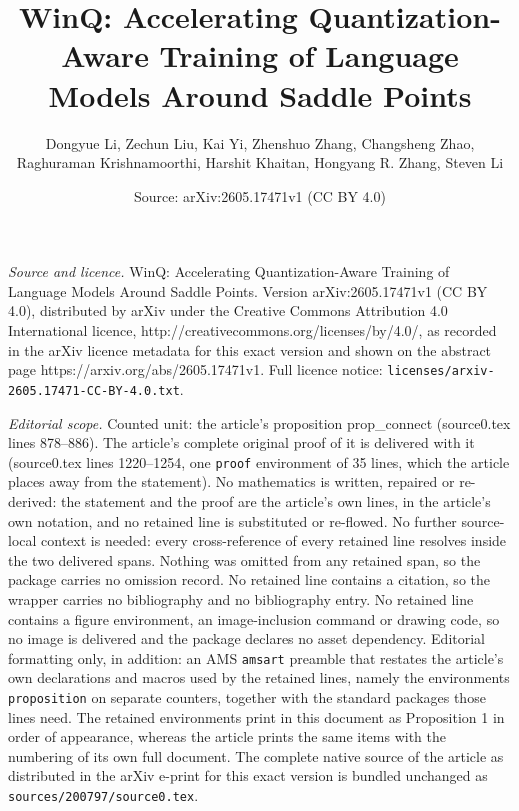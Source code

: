 \documentclass[10pt,a4paper]{amsart}
\title{WinQ: Accelerating Quantization-Aware Training of Language Models Around Saddle Points}
\author{Dongyue Li, Zechun Liu, Kai Yi, Zhenshuo Zhang, Changsheng Zhao, Raghuraman Krishnamoorthi, Harshit Khaitan, Hongyang R. Zhang, Steven Li}
\date{Source: arXiv:2605.17471v1 (CC BY 4.0)}
\begin{document}
\maketitle

\noindent\emph{Source and licence.} WinQ: Accelerating Quantization-Aware Training of Language Models Around Saddle Points. Version arXiv:2605.17471v1 (CC BY 4.0), distributed by arXiv under the Creative Commons Attribution 4.0 International licence, http://creativecommons.org/licenses/by/4.0/, as recorded in the arXiv licence metadata for this exact version and shown on the abstract page https://arxiv.org/abs/2605.17471v1. Full licence notice: \texttt{licenses/arxiv-2605.17471-CC-BY-4.0.txt}.\par\smallskip

\noindent\textit{Editorial scope.} Counted unit: the article's proposition prop\_connect (source0.tex lines 878--886). The article's complete original proof of it is delivered with it (source0.tex lines 1220--1254, one \texttt{proof} environment of 35 lines, which the article places away from the statement). No mathematics is written, repaired or re-derived: the statement and the proof are the article's own lines, in the article's own notation, and no retained line is substituted or re-flowed.  No further source-local context is needed: every cross-reference of every retained line resolves inside the two delivered spans.  Nothing was omitted from any retained span, so the package carries no omission record.  No retained line contains a citation, so the wrapper carries no bibliography and no bibliography entry.  No retained line contains a figure environment, an image-inclusion command or drawing code, so no image is delivered and the package declares no asset dependency.  Editorial formatting only, in addition: an AMS \texttt{amsart} preamble that restates the article's own declarations and macros used by the retained lines, namely the environments \texttt{proposition} on separate counters, together with the standard packages those lines need.  The retained environments print in this document as Proposition 1 in order of appearance, whereas the article prints the same items with the numbering of its own full document.  The complete native source of the article as distributed in the arXiv e-print for this exact version is bundled unchanged as \texttt{sources/200797/source0.tex}.
\end{document}
